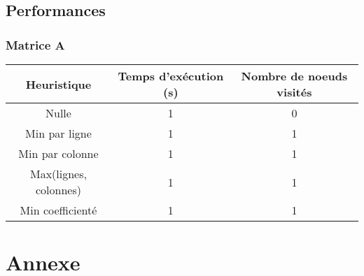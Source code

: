 \documentclass[11pt]{article} %
\begin{document}
\newpage
\subsection{Performances}

\subsubsection{Matrice A}

\begin{center}
    \begin{tabular}{|c|c|c|}
        \hline
        \textbf{Heuristique} & \textbf{Temps d'exécution (s)} & \textbf{Nombre de noeuds visités} \\ \hline
        Nulle &   1   &  0   \\ \hline
        Min par ligne &   1   &  1   \\ \hline
        Min par colonne &   1   &  1   \\ \hline
        Max(lignes, colonnes) &   1   &  1   \\ \hline
        Min coefficienté &   1   &  1   \\ \hline
    \end{tabular}
\end{center}

\newpage

\section{Annexe}
\end{document}
